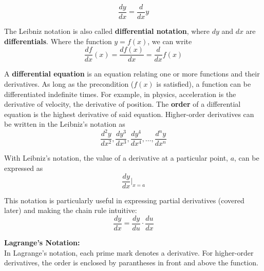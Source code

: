         \begin{equation*}
            \frac{dy}{dx}=\frac{d}{dx}y
        \end{equation*}

        \noindent The Leibniz notation is also called \textbf{differential notation}, where
        $dy$ and $dx$ are \textbf{differentials}. Where the function $y=f(x)$, we can write \\

        \begin{equation*}
            \frac{df}{dx}(x)=\frac{df(x)}{dx}=\frac{d}{dx}f(x)
        \end{equation*}

        \noindent A \textbf{differential equation} is an equation relating one or more functions
        and their derivatives. As long as the precondition ($f(x)$ is satisfied), a function can
        be differentiated indefinite times. For example, in physics, acceleration is the
        derivative of velocity, the derivative of position. The \textbf{order} of a differential
        equation is the highest derivative of said equation. Higher-order derivatives can be
        written in the Leibniz's notation as \\

        \begin{equation*}
            \frac{d^2y}{dx^2}, \frac{dy^3}{dx^3}, \frac{dy^4}{dx^4},\dots,\frac{d^ny}{dx^n}
        \end{equation*}

        \noindent With Leibniz's notation, the value of a derivative at a particular point, $a$,
        can be expressed as \\

        \begin{equation*}
            \frac{dy}{dx}\Bigr|_{x=a}
        \end{equation*}

        \noindent This notation is particularly useful in expressing partial derivatives
        (covered later) and making the chain rule intuitive: \\

        \begin{equation*}
            \frac{dy}{dx} = \frac{dy}{du}\cdot\frac{du}{dx}
        \end{equation*}

        \noindent \color{purple} \textbf{Lagrange's Notation:} \color{black} \\
        In Lagrange's notation, each prime mark denotes a derivative. For higher-order derivatives,
        the order is enclosed by parantheses in front and above the function. \\

